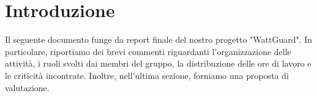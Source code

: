 \section{Introduzione}
Il seguente documento funge da report finale del nostro progetto "WattGuard".
In particolare, riportiamo dei brevi commenti riguardanti l’organizzazione delle attività, i ruoli svolti dai membri del gruppo, la distribuzione delle ore di lavoro e le criticità incontrate. Inoltre, nell’ultima sezione, forniamo una proposta di valutazione.